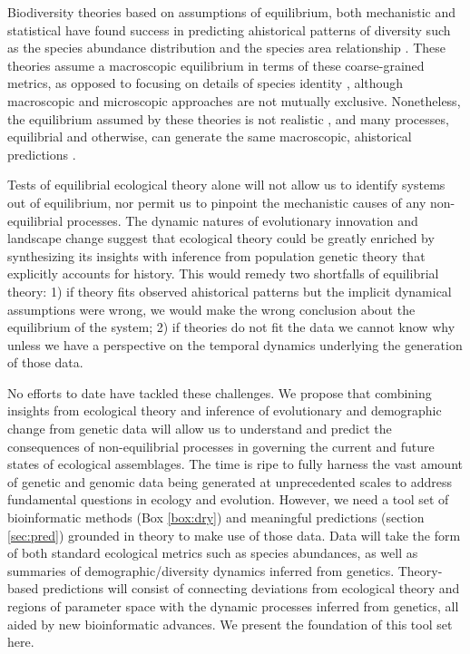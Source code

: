 \documentclass[12pt]{article}
\newcounter{Box}
\begin{document}
Biodiversity theories based on assumptions of
equilibrium, both mechanistic \citep{Hubbell2001-dx, Chesson2000-uc,
  Tilman2004-xt} and statistical \citep[see the
Glossary;][]{Harte2011-um, Pueyo2007-iq} have found success in
predicting ahistorical patterns of diversity such as the species
abundance distribution \citep{White2012-yw, Hubbell2001-dx,
  Harte2011-um} and the species area relationship
\citep{Hubbell2001-dx, Harte2011-um}. These theories assume a
macroscopic equilibrium in terms of these coarse-grained metrics, as opposed to focusing on details of species identity \citep[such as
in][]{blonder2015}, although macroscopic and microscopic approaches are not mutually exclusive.  Nonetheless, the equilibrium assumed by these
theories is not realistic \citep{Ricklefs2006-tn}, and many
processes, equilibrial and otherwise, can generate the same
macroscopic, ahistorical predictions \citep{McGill2007-hx}.

Tests of equilibrial ecological theory alone will not allow us to
identify systems out of equilibrium, nor permit us to pinpoint the
mechanistic causes of any non-equilibrial
processes. The dynamic natures of evolutionary innovation and
landscape change suggest that ecological theory could be greatly
enriched by synthesizing its insights with inference from population
genetic theory that explicitly accounts for history. This would remedy two shortfalls of equilibrial theory:
1) if theory fits observed ahistorical patterns but the implicit
dynamical assumptions were wrong, we would make the wrong conclusion
about the equilibrium of the system; 2) if theories do
not fit the data we cannot know why unless we have a perspective on
the temporal dynamics underlying the generation of those data.

No efforts to date have tackled these challenges. We propose that combining insights from ecological theory and
inference of evolutionary and demographic change from genetic data
will allow us to understand and predict the consequences of
non-equilibrial processes in governing the current and future states
of ecological assemblages. The time is ripe to fully harness the vast amount of genetic and genomic data being generated at unprecedented scales
\citep{Yu2012, pompanon2012, taberlet2012, ji2013, zhou2013, tang2014,
  bohmann2014, gibson2014, shokralla2015, linard2015, leray2015,
  dodsworth2015, liu2016} to address fundamental questions in ecology
and evolution. However, we need a tool set of bioinformatic methods (Box
\ref{box:dry}) and meaningful predictions (section \ref{sec:pred})
grounded in theory to make use of those data. Data will take the form
of both standard ecological metrics such as species abundances, as
well as summaries of demographic/diversity dynamics inferred from
genetics. Theory-based predictions will consist of connecting
deviations from ecological theory and regions of parameter space with
the dynamic processes inferred from genetics, all aided by new
bioinformatic advances. We present the foundation of this tool set here.
\end{document}

